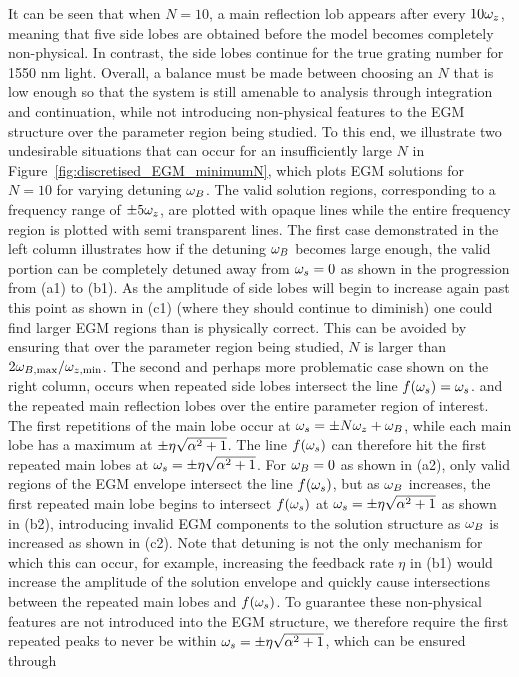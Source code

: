It can be seen that when $N=10$, a main reflection lob appears after every $10\omega_z$, meaning that five side lobes are obtained before the model becomes completely non-physical. 
In contrast, the side lobes continue for the true grating number for 1550 nm light. 
Overall, a balance must be made between choosing an $N$ that is low enough so that the system is still amenable to analysis through integration and continuation, 
while not introducing non-physical features to the EGM structure over the parameter region being studied. 
To this end, we illustrate two undesirable situations that can occur for an insufficiently large $N$ in Figure~\ref{fig:discretised_EGM_minimumN}, which plots EGM solutions for $N=10$ for varying detuning $\omega_B$. 
The valid solution regions, corresponding to a frequency range of $\pm 5 \omega_z$, are plotted with opaque lines while the entire frequency region is plotted with semi transparent lines. 
The first case demonstrated in the left column illustrates how if the detuning $\omega_B$ becomes large enough, the valid portion can be completely detuned away from $\omega_s=0$ as shown in the progression from (a1) to (b1). 
As the amplitude of side lobes will begin to increase again past this point as shown in (c1) (where they should continue to diminish) one could find larger EGM regions than is physically correct. 
This can be avoided by ensuring that over the parameter region being studied, $N$ is larger than $2{\omega}_{B, \max}/{\omega}_{z,\min}$. 
The second and perhaps more problematic case shown on the right column, occurs when repeated side lobes intersect the line $f(\omega_s) = \omega_s$. 
and the repeated main reflection lobes over the entire parameter region of interest. The first repetitions of the main lobe occur at $\omega_s = \pm N \omega_z + \omega_B$, while each main lobe has a maximum at $\pm \eta \sqrt{\alpha^2+1}$. 
The line $f(\omega_s)$ can therefore hit the first repeated main lobes at $\omega_s = \pm \eta \sqrt{\alpha^2+1}$. 
For $\omega_B=0$ as shown in (a2), only valid regions of the EGM envelope intersect the line $f(\omega_s)$, but as $\omega_B$ increases, 
the first repeated main lobe begins to intersect $f(\omega_s)$ at $\omega_s = \pm \eta \sqrt{\alpha^2+1}$ as shown in (b2), introducing invalid EGM components to the solution structure as $\omega_B$ is increased as shown in (c2). 
Note that detuning is not the only mechanism for which this can occur, for example, 
increasing the feedback rate $\eta$ in (b1) would increase the amplitude of the solution envelope and quickly cause intersections between the repeated main lobes and $f(\omega_s)$. 
To guarantee these non-physical features are not introduced into the EGM structure, we therefore require the first repeated peaks to never be within $\omega_s = \pm \eta \sqrt{\alpha^2+1}$, which can be ensured through
